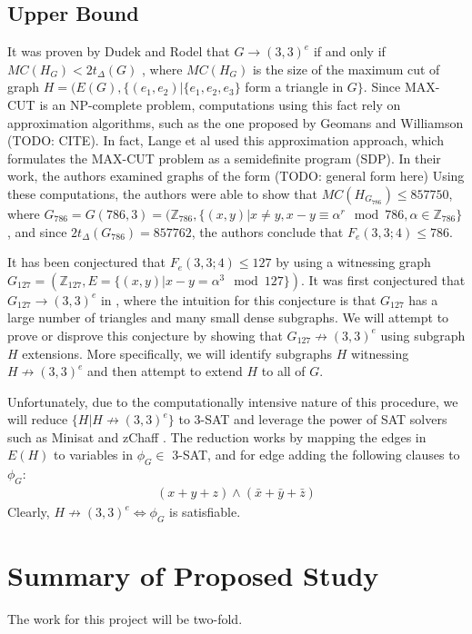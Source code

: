 \documentclass[paper=a4, fontsize=11pt]{scrartcl} %
\begin{document}
\subsection{Upper Bound}
It was proven by Dudek and Rodel that $G \to (3,3)^e$ if and only if $MC(H_G) < 2t_{\Delta}(G)$ \cite{dudek08},
where $MC(H_G)$ is the size of the maximum cut of graph $H = (E(G), \{(e_1, e_2) | \{e_1, e_2, e_3\}$ form a triangle
in $G\}$. Since MAX-CUT is an NP-complete problem, computations using this fact rely on approximation
algorithms, such as the one proposed by Geomans and Williamson (TODO: CITE). In fact, Lange et al \cite{arlFolkman}
used this approximation approach, which formulates the MAX-CUT problem as a semidefinite program (SDP).
In their work, the authors examined graphs of the form (TODO: general form here)
Using these computations, the authors were able to show that $MC(H_{G_{786}}) \leq 857750$, where
$G_{786} = G(786, 3) = (\mathbb{Z}_{786}, \{(x,y) | x \not= y, x - y \equiv \alpha^r \mod 786, \alpha \in \mathbb{Z}_{786}\}$,
and since $2t_{\Delta}(G_{786}) = 857762$, the authors conclude that $F_e(3,3;4) \leq 786$. 

It has been conjectured that $F_e(3,3;4) \leq 127$ by using a witnessing graph 
$G_{127} = (\mathbb{Z}_{127}, E = \{(x,y) | x - y = \alpha^3 \mod 127\})$.
It was first conjectured that $G_{127} \to (3,3)^e$ in \cite{spr07}, where the intuition for this
conjecture is that $G_{127}$ has a large number of triangles and many small dense subgraphs.
We will attempt to prove or disprove this conjecture by showing that $G_{127} \not \to (3,3)^e$
using subgraph $H$ extensions. More specifically, we will identify subgraphs $H$ witnessing
$H \not \to (3,3)^e$ and then attempt to extend $H$ to all of $G$. 

Unfortunately, due to the computationally
intensive nature of this procedure, we will reduce $\{H | H \not \to (3,3)^e\}$ to 3-SAT and leverage
the power of SAT solvers such as Minisat \cite{minisat} and zChaff \cite{zchaff}. The reduction works by
mapping the edges in $E(H)$ to variables in $\phi_G \in$ 3-SAT, and for edge adding the following
clauses to $\phi_G$:
\begin{align*}
(x + y + z) \wedge (\bar{x} + \bar{y} + \bar{z})
\end{align*}
Clearly, $H \not \to (3,3)^e \Leftrightarrow \phi_G$ is satisfiable. 

\section{Summary of Proposed Study}
The work for this project will be two-fold. 
\end{document}
